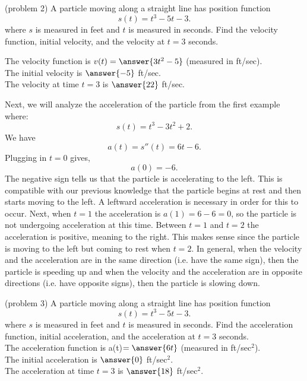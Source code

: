 \documentclass{ximera}
\begin{document}
\begin{problem}(problem 2)
A particle moving along a straight line has position function
\[s(t) = t^3 - 5t -3.\]
where $s$ is measured in feet and $t$ is measured in seconds.
Find the velocity function, initial velocity, and the velocity at $t = 3$ seconds.

The velocity function is $v(t) = \answer{3t^2 -5}$ (measured in ft/sec).\\
The initial velocity is $\answer{-5}$ ft/sec.\\
The velocity at time $t=3$ is $\answer{22}$ ft/sec.\\


\end{problem}

 

\begin{example}[example 3]
Next, we will analyze the acceleration of the particle from the first example where:
\[s(t) = t^3 - 3t^2 + 2.\]
We have
\[a(t) = s''(t) = 6t -6.\]
Plugging in $t=0$ gives,
\[a(0) = -6.\]
The negative sign tells us that the particle is accelerating to the left. 
This is compatible with our previous knowledge that the particle begins at rest and then starts moving to the left. 
A leftward acceleration is necessary in order for this to occur.
Next, when $t=1$ the acceleration is $a(1) = 6-6 = 0$, so the particle is not undergoing acceleration at this time.
Between $t=1$ and $t = 2$ the acceleration is positive, meaning to the right. 
This makes sense since the particle is moving to the left but coming to rest when $t = 2$.
In general, when the velocity and the acceleration are in the same direction (i.e. have the same sign), 
then the particle is speeding up and when
the velocity and the acceleration are in opposite directions (i.e. have opposite signs),  then the particle is slowing down.
\end{example}



\begin{problem}(problem 3)
A particle moving along a straight line has position function
\[s(t) = t^3 - 5t -3.\]
where $s$ is measured in feet and $t$ is measured in seconds.
Find the acceleration function, initial acceleration, and the acceleration at $t = 3$ seconds.\\

The acceleration function is a(t)$ = \answer{6t}$ (measured in ft/sec$^2$).\\
The initial acceleration is $\answer{0}$ ft/sec$^2$.\\
The acceleration at time $t=3$ is $\answer{18}$ ft/sec$^2$.


\end{problem}
\end{document}
